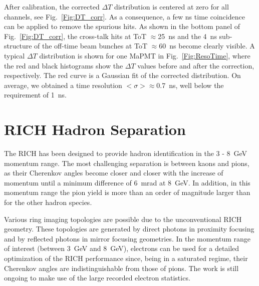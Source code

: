 \documentclass[5p,times,twocolumn]{elsarticle}
\def\dT{$\Delta T$ }
\begin{document}
\twocolumn

After calibration, the corrected $\Delta T$ distribution is centered at zero for all channels, see
Fig.~\ref{Fig:DT_corr}. As a consequence, a few ns time coincidence can be applied to remove the spurious hits. As
shown in the bottom panel of Fig.~\ref{Fig:DT_corr}, the cross-talk hits at ToT $\approx$25~ns and the 4~ns
sub-structure of the off-time beam bunches at ToT $\approx$60~ns become clearly visible. A typical \dT
distribution is shown for one MaPMT in Fig.~\ref{Fig:ResoTime}, where the red and black histograms show the
$\Delta T$ values before and after the correction, respectively. The red curve is a Gaussian fit of the
corrected distribution.
On average, we obtained a time resolution $<\sigma> \approx$0.7~ns, well below the requirement of 1~ns.

\section{RICH Hadron Separation}
\label{sec:HadronID}

The RICH has been designed to provide hadron identification in the 3 - 8~GeV momentum range. The most
challenging separation is between kaons and pions, as their Cherenkov angles become closer and closer with the
increase of momentum until a minimum difference of 6~mrad at 8~GeV. In addition, in this momentum range the
pion yield is more than an order of magnitude larger than for the other hadron species.


Various ring imaging topologies are possible due to the  unconventional RICH geometry. These topologies are generated
by direct photons in proximity focusing and by reflected photons in mirror focusing geometries. In the momentum
range of interest (between 3~GeV and 8~GeV), electrons can be used for a detailed optimization of the RICH
performance since, being in a saturated regime, their Cherenkov angles are indistinguishable from those of pions.
The work is still ongoing to make use of the large recorded electron statistics.
\end{document}
